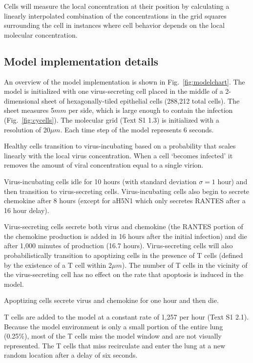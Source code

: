 \documentclass[preprint,10pt,authoryear]{article}
\begin{document}
Cells will measure the local concentration at their position by calculating a linearly interpolated combination of the concentrations in the grid squares surrounding the cell in instances where cell behavior depends on the local molecular concentration.


\subsection{Model implementation details}

An overview of the model implementation is shown in Fig.~\ref{fig:modelchart}.  The model is initialized with one virus-secreting cell placed in the middle of a 2-dimensional sheet of hexagonally-tiled epithelial cells (288,212 total cells).  The sheet measures 5$mm$ per side, which is large enough to contain the infection (Fig.~\ref{fig:cycells}).  The molecular grid (Text S1 1.3) is initialized with a resolution of 20$\mu m$.  Each time step of the model represents 6 seconds.

Healthy cells transition to virus-incubating based on a probability that scales linearly with the local virus concentration.   When a cell `becomes infected' it removes the amount of viral concentration equal to a single virion. 

Virus-incubating cells idle for 10 hours (with standard deviation $\sigma=1$ hour) and then transition to virus-secreting cells.  Virus-incubating cells also begin to secrete chemokine after 8 hours (except for aH5N1 which only secretes RANTES after a 16 hour delay).  

Virus-secreting cells secrete both virus and chemokine (the RANTES portion of the chemokine production is added in 16 hours after the initial infection) and die after 1,000 minutes of production (16.7 hours).  Virus-secreting cells will also probabilistically transition to apoptizing cells in the presence of T cells (defined by the existence of a T cell within 2$\mu m$).  The number of T cells in the vicinity of the virus-secreting cell has no effect on the rate that apoptosis is induced in the model.

Apoptizing cells secrete virus and chemokine for one hour and then die.

T cells are added to the model at a constant rate of 1,257 per hour (Text S1 2.1).  Because the model environment is only a small portion of the entire lung (0.25\%), most of the T cells miss the model window and are not visually represented.  The T cells that miss recirculate and enter the lung at a new random location after a delay of six seconds.
\end{document}

